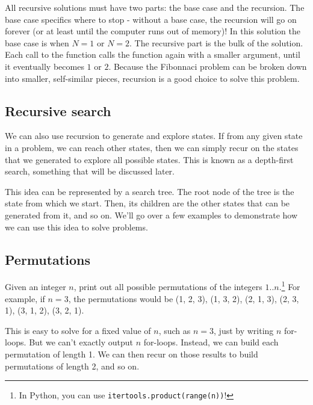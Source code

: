 All recursive solutions must have two parts: the base case and the recursion.  The base case specifics where to stop - without a base case, the recursion will go on forever (or at least until the computer runs out of memory)!  In this solution the base case is when $ N = 1 $ or $ N = 2 $.  The recursive part is the bulk of the solution.  Each call to the function calls the function again with a smaller argument, until it eventually becomes $ 1 $ or $ 2 $.  Because the Fibonnaci problem can be broken down into smaller, self-similar pieces, recursion is a good choice to solve this problem.


\subsection{Recursive search} \label{recursive-search} %
We can also use recursion to generate and explore states. If from any given state in a problem, we can reach other states, then we can simply recur on the states that we generated to explore all possible states. This is known as a depth-first search, something that will be discussed later.

This idea can be represented by a search tree. The root node of the tree is the state from which we start. Then, its children are the other states that can be generated from it, and so on. We'll go over a few examples to demonstrate how we can use this idea to solve problems.


\subsection{Permutations}

\begin{Problem}
Given an integer $n$, print out all possible permutations of the integers $1..n$.\footnote{In Python, you can use \texttt{itertools.product(range(n))}!} For example, if $n=3$, the permutations would be (1, 2, 3), (1, 3, 2), (2, 1, 3), (2, 3, 1), (3, 1, 2), (3, 2, 1).
\end{Problem}

\noindent This is easy to solve for a fixed value of $n$, such as $n=3$, just by writing $n$ for-loops. But we can't exactly output $n$ for-loops. Instead, we can build each permutation of length 1. We can then recur on those results to build permutations of length 2, and so on.




